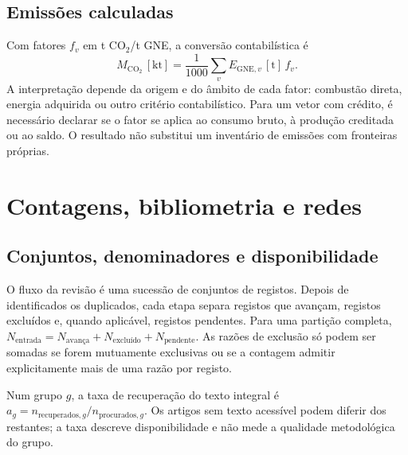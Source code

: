 \subsection{Emissões calculadas}
\label{sec:mat-emissoes}
Com fatores $f_v$ em t CO$_2$/t GNE, a
conversão contabilística é
\begin{equation}
M_{\mathrm{CO_2}}\,[\mathrm{kt}]=\frac1{1000}\sum_v E_{\mathrm{GNE},v}\,[\mathrm{t}]\,f_v.
\label{eq:mat-emissoes}
\end{equation}
A interpretação depende da origem e do âmbito de cada fator: combustão direta, energia adquirida ou outro critério contabilístico. Para um vetor com crédito, é necessário declarar se o fator se aplica ao consumo bruto, à produção creditada ou ao saldo. O resultado não substitui um inventário de emissões com fronteiras próprias.


\section{Contagens, bibliometria e redes}
\label{sec:mat-bibliometria}

\subsection{Conjuntos, denominadores e disponibilidade}
\label{sec:mat-contagens}
O fluxo da revisão é uma sucessão de conjuntos de registos. Depois de identificados os duplicados, cada etapa separa registos que avançam, registos excluídos e, quando aplicável, registos pendentes. Para uma partição completa, $N_{\mathrm{entrada}}=N_{\mathrm{avança}}+N_{\mathrm{excluído}}+N_{\mathrm{pendente}}$. As razões de exclusão só podem ser somadas se forem mutuamente exclusivas ou se a contagem admitir explicitamente mais de uma razão por registo.

Num grupo $g$, a taxa de recuperação do texto integral é $a_g=n_{\mathrm{recuperados},g}/n_{\mathrm{procurados},g}$. Os artigos sem texto acessível podem diferir dos restantes; a taxa descreve disponibilidade e não mede a qualidade metodológica do grupo.


